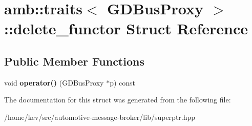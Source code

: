 \hypertarget{structamb_1_1traits_3_01GDBusProxy_01_4_1_1delete__functor}{\section{amb\+:\+:traits$<$ G\+D\+Bus\+Proxy $>$\+:\+:delete\+\_\+functor Struct Reference}
\label{structamb_1_1traits_3_01GDBusProxy_01_4_1_1delete__functor}
}
\subsection*{Public Member Functions}
\begin{DoxyCompactItemize}
\item 
\hypertarget{structamb_1_1traits_3_01GDBusProxy_01_4_1_1delete__functor_aa6bea2fb8b4ddb29378fa0188652b8da}{void {\bfseries operator()} (G\+D\+Bus\+Proxy $\ast$p) const }\label{structamb_1_1traits_3_01GDBusProxy_01_4_1_1delete__functor_aa6bea2fb8b4ddb29378fa0188652b8da}

\end{DoxyCompactItemize}


The documentation for this struct was generated from the following file\+:\begin{DoxyCompactItemize}
\item 
/home/kev/src/automotive-\/message-\/broker/lib/superptr.\+hpp\end{DoxyCompactItemize}
